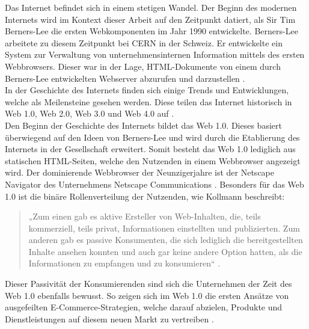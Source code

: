 \documentclass[a4paper]{scrartcl}
\begin{document}
Das Internet befindet sich in einem stetigen Wandel. Der Beginn des modernen Internets wird im Kontext dieser Arbeit auf den Zeitpunkt datiert, als Sir Tim Berners-Lee die ersten Webkomponenten im Jahr 1990 entwickelte. Berners-Lee arbeitete zu diesem Zeitpunkt bei CERN in der Schweiz. Er entwickelte ein System zur Verwaltung von unternehmensinternen Information mittels des ersten Webbrowsers. Dieser war in der Lage, HTML-Dokumente von einem durch Berners-Lee entwickelten Webserver abzurufen und darzustellen \autocite{Berners-Lee}. \\
In der Geschichte des Internets finden sich einige Trends und Entwicklungen, welche als Meilensteine gesehen werden. Diese teilen das Internet historisch in Web 1.0, Web 2.0, Web 3.0 und Web 4.0 auf \autocite[133]{Kollmann}. \\
Den Beginn der Geschichte des Internets bildet das Web 1.0. Dieses basiert überwiegend auf den Ideen von Berners-Lee und wird durch die Etablierung des Internets in der Gesellschaft erweitert. Somit besteht das Web 1.0 lediglich aus statischen HTML-Seiten, welche den Nutzenden in einem Webbrowser angezeigt wird. Der dominierende Webbrowser der Neunzigerjahre ist der Netscape Navigator des Unternehmens Netscape Communications \autocite{Oreilly}. Besonders für das Web 1.0 ist die binäre Rollenverteilung der Nutzenden, wie Kollmann beschreibt:
\begin{quote}
	„Zum einen gab es aktive Ersteller von Web-Inhalten, die, teils kommerziell, teils privat, Informationen einstellten und publizierten. Zum anderen gab es passive Konsumenten, die sich lediglich die bereitgestellten Inhalte ansehen konnten und auch gar keine andere Option hatten, als die Informationen zu empfangen und zu konsumieren“ \autocite[134]{Kollmann}.
\end{quote}
Dieser Passivität der Konsumierenden sind sich die Unternehmen der Zeit des Web 1.0 ebenfalls bewusst. So zeigen sich im Web 1.0 die ersten Ansätze von ausgefeilten E-Commerce-Strategien, welche darauf abzielen, Produkte und Dienstleistungen auf diesem neuen Markt zu vertreiben \autocite[1204]{Kollmann_Lomberg}. \\
\end{document}
